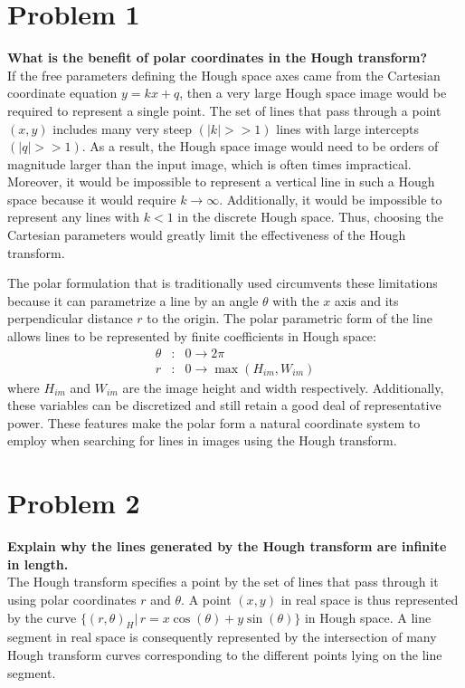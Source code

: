 \documentclass[aps,letterpaper,10pt]{article}
\begin{document}
\section{Problem 1}
\textbf{What is the benefit of polar coordinates in the Hough transform?}\\

If the free parameters defining the Hough space axes came from the Cartesian coordinate equation $y=kx+q$, then a very large Hough space image would be required to represent a single point.  The set of lines that pass through a point $(x,y)$ includes many very steep $(|k|>>1)$ lines with large intercepts $(|q|>>1)$. As a result, the Hough space image would need to be orders of magnitude larger than the input image, which is often times impractical.  Moreover, it would be impossible to represent a vertical line in such a Hough space because it would require $k\rightarrow\infty.$  Additionally, it would be impossible to represent any lines with $k<1$ in the discrete Hough space.  Thus, choosing the Cartesian parameters would greatly limit the effectiveness of the Hough transform.

The polar formulation that is traditionally used circumvents these limitations because it can parametrize a line by an angle $\theta$ with the $x$ axis and its perpendicular distance $r$ to the origin.  The polar parametric form of the line allows lines to be represented by finite coefficients in Hough space:
\begin{eqnarray*}
\theta & : & 0\rightarrow 2\pi \\
r & : & 0\rightarrow\max(H_{im},W_{im})
\end{eqnarray*}
where $H_{im}$ and $W_{im}$ are the image height and width respectively.  Additionally, these variables can be discretized and still retain a good deal of representative power.  These features make the polar form a natural coordinate system to employ when searching for lines in images using the Hough transform.

\section{Problem 2}
\textbf{Explain why the lines generated by the Hough transform are infinite in length.}\\

The Hough transform specifies a point by the set of lines that pass through it using polar coordinates $r$ and $\theta$.  A point $(x,y)$ in real space is thus represented by the curve $\{(r,\theta)_H|\, r = x\cos(\theta) + y\sin(\theta)\}$ in Hough space. A line segment in real space is consequently represented by the intersection of many Hough transform curves corresponding to the different points lying on the line segment.
\end{document}
